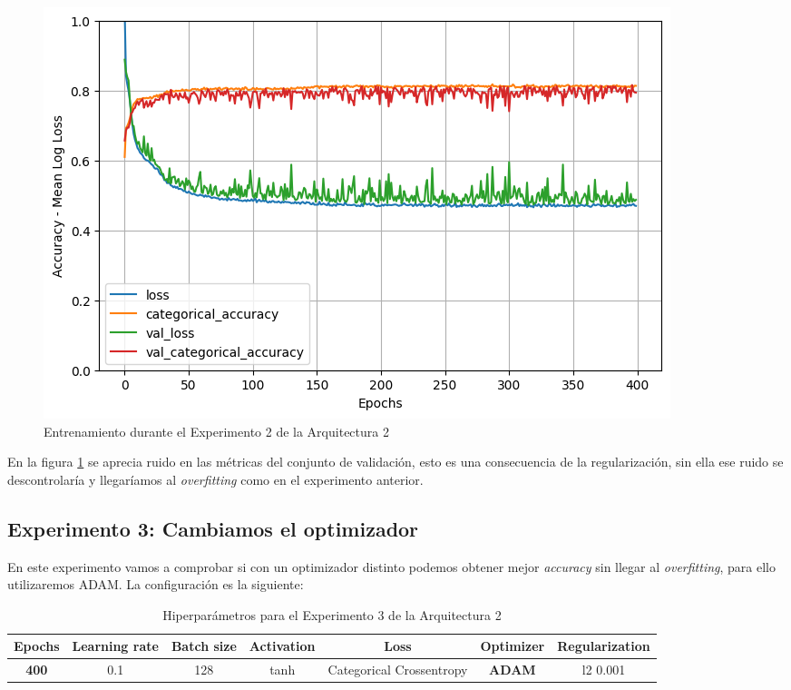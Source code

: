 \documentclass{article}
\begin{document}
			\begin{figure}[!h]
				\begin{center}
					\includegraphics[scale=0.5]{tr-a2-e2.png}		
					\caption{Entrenamiento durante el Experimento 2 de la Arquitectura 2}	
					\label{tr-a2-e2}
				\end{center}
			\end{figure}
			
			En la figura \ref{tr-a2-e2} se aprecia ruido en las m\'etricas del conjunto de validaci\'on, esto es una consecuencia de la regularizaci\'on, sin ella ese ruido se descontrolar\'ia y llegar\'iamos al \textit{overfitting} como en el experimento anterior.
			
			
		\subsection{Experimento 3: Cambiamos el optimizador}
			En este experimento vamos a comprobar si con un optimizador distinto podemos obtener mejor \textit{accuracy} sin llegar al \textit{overfitting}, para ello utilizaremos ADAM. La configuraci\'on es la siguiente:
			
			\begin{table}[!h]
				\begin{center}
					\begin{tabular}{| c | c | c | c | c | c | c |}
						\textbf{Epochs} & \textbf{Learning rate} & \textbf{Batch size} & \textbf{Activation} & \textbf{Loss} & \textbf{Optimizer} & \textbf{Regularization} \\ \hline
						\textbf{400} & 0.1 & 128 & tanh & Categorical Crossentropy & \textbf{ADAM} & l2 0.001
					\end{tabular}
					\caption{Hiperpar\'ametros para el Experimento 3 de la Arquitectura 2}
					\label{tab:hip-a2-e3}
				\end{center}
			\end{table}
			
\end{document}

